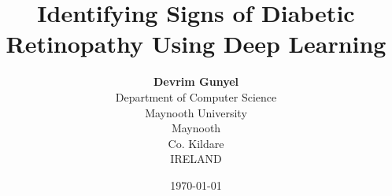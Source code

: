 \documentclass[a4paper,12pt]{report}
\begin{document}
\author{\textbf{Devrim Gunyel}\\[1ex]
  Department of Computer Science\\
  Maynooth University\\
  Maynooth\\
  Co. Kildare\\
  IRELAND}
\date{\today}
\title{Identifying Signs of Diabetic Retinopathy Using Deep Learning}
\maketitle







\tableofcontents

\newpage







\renewcommand{\bibsection}{\chapter{Bibliography}}
\cleardoublepage
\end{document}
